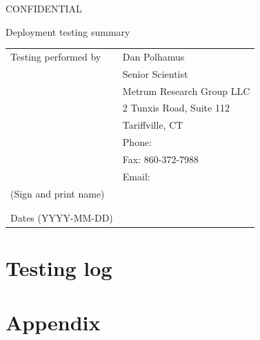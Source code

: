 \documentclass{article}
\newcommand{\topic}{Deployment testing summary}
\newcommand{\testinglog}{deployment-testing-log.pdf}
\begin{document}
\vspace*{1cm}
\begin{center}
{\large CONFIDENTIAL} 


\vspace*{1cm}


\vspace*{1cm}

{\Large \topic}
\vspace{3.0cm}
\end{center}

\newpage
\vspace*{1cm}
\begin{center}
\vspace{3.0cm}

\begin{tabular}{|l|l|}\hline
Testing performed by &   Dan Polhamus\\
                      &  Senior Scientist \\
                      &  Metrum Research Group LLC \\
                      &  2 Tunxis Road, Suite 112\\
                      &  Tariffville, CT\\
                      &  Phone:  \\
                      &  Fax: 860-372-7988 \\
                      &  Email:  \\\hline
 (Sign and print name) & \\
                       & \\
                       & \\\hline
Dates (YYYY-MM-DD)     &               \\\hline



\end{tabular}

\end{center}

\newpage

\section*{Testing log}



\newpage


\section*{Appendix}
\end{document}
